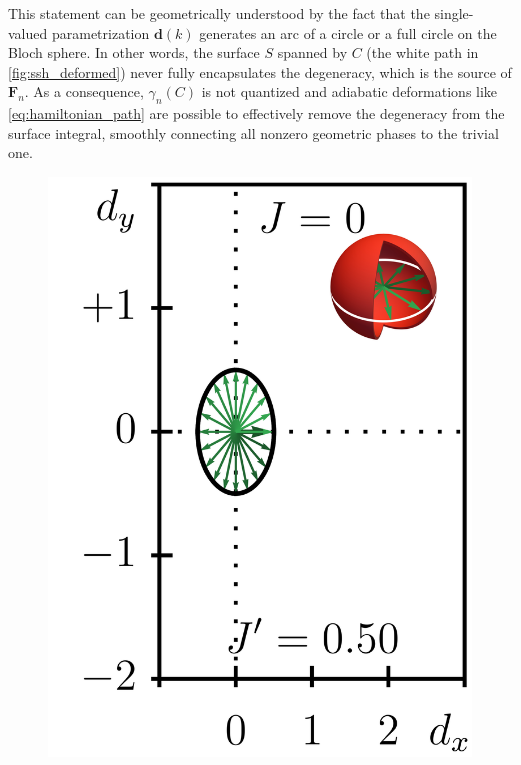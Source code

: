 \documentclass{svmono}
\providecommand{\DIFaddtex}[1]{{\protect\color{blue}\uwave{#1}}} %
\providecommand{\DIFdeltex}[1]{{\protect\color{red}\sout{#1}}}                      %
\providecommand{\DIFaddbegin}{} %
\providecommand{\DIFaddend}{} %
\providecommand{\DIFdelbegin}{} %
\providecommand{\DIFdelend}{} %
\providecommand{\DIFadd}[1]{\texorpdfstring{\DIFaddtex{#1}}{#1}} %
\providecommand{\DIFdel}[1]{\texorpdfstring{\DIFdeltex{#1}}{}} %
\newcommand{\DIFscaledelfig}{0.5}
\newlength{\DIFdelgraphicswidth} %
\newlength{\DIFdelgraphicsheight} %
\newcommand{\DIFaddincludegraphics}[2][]{{\color{blue}\fbox{\DIFOincludegraphics[#1]{#2}}}} %
\newcommand{\DIFdelincludegraphics}[2][]{%
\sbox{\DIFdelgraphicsbox}{\DIFOincludegraphics[#1]{#2}}%
\settoboxwidth{\DIFdelgraphicswidth}{\DIFdelgraphicsbox} %
\settoboxtotalheight{\DIFdelgraphicsheight}{\DIFdelgraphicsbox} %
\scalebox{\DIFscaledelfig}{%
\parbox[b]{\DIFdelgraphicswidth}{\usebox{\DIFdelgraphicsbox}\\[-\baselineskip] \rule{\DIFdelgraphicswidth}{0em}}\llap{\resizebox{\DIFdelgraphicswidth}{\DIFdelgraphicsheight}{%
\setlength{\unitlength}{\DIFdelgraphicswidth}%
\begin{picture}(1,1)%
\thicklines\linethickness{2pt} %
{\color[rgb]{1,0,0}\put(0,0){\framebox(1,1){}}}%
{\color[rgb]{1,0,0}\put(0,0){\line( 1,1){1}}}%
{\color[rgb]{1,0,0}\put(0,1){\line(1,-1){1}}}%
\end{picture}%
}\hspace*{3pt}}} %
} %
\DeclareRobustCommand{\DIFaddbegin}{\DIFOaddbegin \let\includegraphics\DIFaddincludegraphics} %
\DeclareRobustCommand{\DIFaddend}{\DIFOaddend \let\includegraphics\DIFOincludegraphics} %
\DeclareRobustCommand{\DIFdelbegin}{\DIFOdelbegin \let\includegraphics\DIFdelincludegraphics} %
\DeclareRobustCommand{\DIFdelend}{\DIFOaddend \let\includegraphics\DIFOincludegraphics} %
\begin{document}
This statement can be geometrically understood by the fact that the single-valued parametrization \DIFdelbegin \DIFdel{$\bm d(k)$ }\DIFdelend \DIFaddbegin \DIFadd{$\bm B(k)$ }\DIFaddend generates an arc of a circle or a full circle on the Bloch sphere.
In other words, the surface $S$ spanned by $C$ (the white path in \cref{fig:ssh_deformed}) never fully encapsulates the degeneracy, which is the source of ${\bm F}_n$.
As a consequence, $\gamma_n(C)$ is not quantized and adiabatic deformations like \cref{eq:hamiltonian_path} are possible to effectively remove the degeneracy from the surface integral, smoothly connecting all nonzero geometric phases to the trivial one.
\DIFaddbegin \begin{figure}[ht]
    \centering
    \includegraphics{figures/ssh_unnormalized_winding_2.png}

\end{figure}
\end{document}
